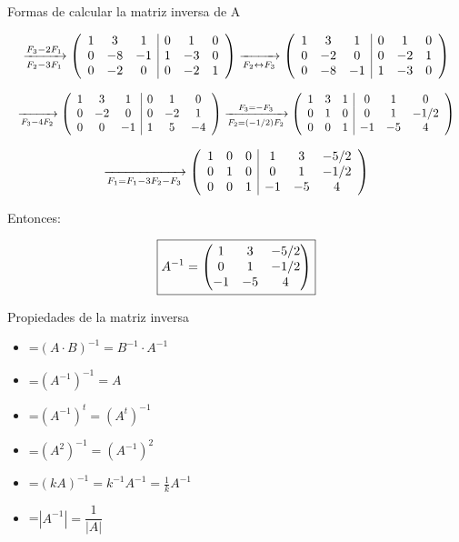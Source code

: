 \documentclass[11pt,a4paper]{article}
\newcommand{\fmm}[1]{\setbox0=\hbox{$#1$}\ifdim\wd0>\linewidth\fmdisp{#1}\else\mbox{\box0}\fi}
\newcommand{\fmdisp}[1]{\[\setbox2=\hbox{$\displaystyle #1$}\ifdim\wd2>\linewidth\resizebox{\linewidth}{!}{\box2}\else\box2\fi\]}
\begin{document}
\begin{fmex}{Formas de calcular la matriz inversa de A}
\begin{enumerate}[label=\textbf{\arabic*.},leftmargin=*]
\fmdisp{\xrightarrow[F_2-3F_1]{F_3-2F_1}\left(\begin{array}{ccc|ccc}1 & 3 & 1 & 0 & 1 & 0\\ 0 & -8 & -1 & 1 & -3 & 0\\ 0 & -2 & 0 & 0 & -2 & 1\end{array}\right)\xrightarrow[F_2\leftrightarrow F_3]{}\left(\begin{array}{ccc|ccc}1 & 3 & 1 & 0 & 1 & 0\\ 0 & -2 & 0 & 0 & -2 & 1\\ 0 & -8 & -1 & 1 & -3 & 0\end{array}\right)}

\fmdisp{\xrightarrow[F_3-4F_2]{}\left(\begin{array}{ccc|ccc}1 & 3 & 1 & 0 & 1 & 0\\ 0 & -2 & 0 & 0 & -2 & 1\\ 0 & 0 & -1 & 1 & 5 & -4\end{array}\right)\xrightarrow[F_2=(-1/2)F_2]{F_3=-F_3}\left(\begin{array}{ccc|ccc}1 & 3 & 1 & 0 & 1 & 0\\ 0 & 1 & 0 & 0 & 1 & -1/2\\ 0 & 0 & 1 & -1 & -5 & 4\end{array}\right)}

\fmdisp{\xrightarrow[F_1=F_1-3F_2-F_3]{}\left(\begin{array}{ccc|ccc}1 & 0 & 0 & 1 & 3 & -5/2\\ 0 & 1 & 0 & 0 & 1 & -1/2\\ 0 & 0 & 1 & -1 & -5 & 4\end{array}\right)}

Entonces:

\fmdisp{\boxed{A^{-1}=\begin{pmatrix}1 & 3 & -5/2\\ 0 & 1 & -1/2\\ -1 & -5 & 4\end{pmatrix}}}

\end{enumerate}
\end{fmex}

\begin{fmprop}{Propiedades de la matriz inversa}
\begin{multicols}{2}
\begin{itemize}
\item \fmm{(A\cdot B)^{-1}=B^{-1}\cdot A^{-1}}
\item \fmm{(A^{-1})^{-1}=A}
\item \fmm{(A^{-1})^t=(A^t)^{-1}}
\item \fmm{(A^2)^{-1}=(A^{-1})^2}
\item \fmm{(kA)^{-1} = k^{-1}A^{-1}=\frac{1}{k}A^{-1}}
\item \fmm{|A^{-1}|=\dfrac{1}{|A|}}
\end{itemize}
\end{multicols}
\end{fmprop}
\end{document}
